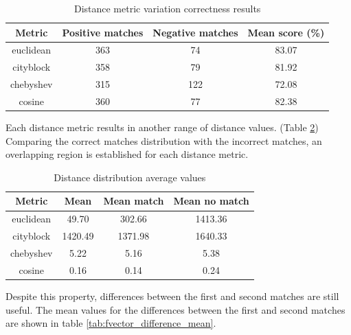 \renewcommand{\arraystretch}{1.2}
\begin{table}[htbp]
    \caption{Distance metric variation correctness results}
    \centering
    \begin{center}
        \begin{tabular}{ |c|c|c|c|  }
         \hline
         Metric& Positive matches &Negative matches&Mean score (\%)\\
         \hline \hline
         euclidean & 363 & 74 & 83.07\\
         \hline
         cityblock & 358 & 79 & 81.92\\
         \hline
         chebyshev & 315 & 122 & 72.08\\
         \hline
         cosine & 360 & 77 & 82.38\\
         \hline
        \end{tabular}
    \end{center}
    \label{tab:fvector_score}
\end{table}

Each distance metric results in another range of distance values. (Table \ref{tab:fvector_distance_mean}) Comparing the correct matches distribution with the incorrect matches, an overlapping region is established for each distance metric.

\renewcommand{\arraystretch}{1.2}
\begin{table}[htbp]
    \caption{Distance distribution average values}
    \centering
    \begin{center}
        \begin{tabular}{ |c|c|c|c|  }
         \hline 
         Metric& Mean & Mean match & Mean no match\\
         \hline \hline
         euclidean  & 49.70 & 302.66 & 1413.36\\
         \hline
         cityblock & 1420.49 & 1371.98 & 1640.33\\
         \hline
         chebyshev & 5.22 & 5.16 & 5.38\\
         \hline
         cosine & 0.16 & 0.14 & 0.24\\
         \hline
         \end{tabular}
    \end{center}
    \label{tab:fvector_distance_mean}
\end{table}

Despite this property, differences between the first and second matches are still useful. The mean values for the differences between the first and second matches are shown in table \ref{tab:fvector_difference_mean}.


